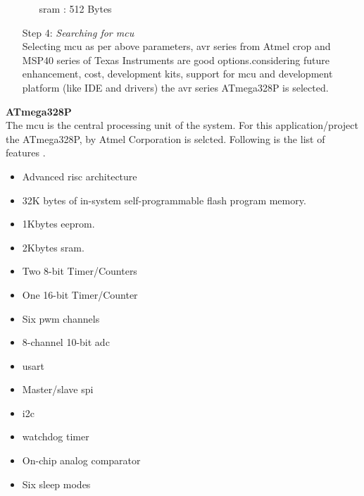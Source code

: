 \begin{itemize}
\begin{itemize}
				\item[\acrshort{sram} :] 512 Bytes
			\end{itemize}
		
		
		\item[Step 4:] \emph{Searching for \gls{mcu}}\\
		Selecting \gls{mcu} as per above parameters, \gls{avr} series from Atmel crop and MSP40 series of Texas Instruments are good options.considering future enhancement, cost, development kits, support for \gls{mcu} and development platform (like IDE and drivers) the \gls{avr} series ATmega328P is selected. 		 
		 
	\end{itemize}
	
	\textbf{ATmega328P}\\
	 
	   The \gls{mcu} is the central processing unit of the system. For this application/project the ATmega328P, by Atmel Corporation is selcted. Following is the list of features \cite{AtMega328P}.
	 
	 \begin{itemize}
		\item Advanced \gls{risc} architecture
		\item 32K bytes of in-system self-programmable flash program memory.
		\item 1Kbytes \gls{eeprom}.
		\item 2Kbytes \gls{sram}.
		\item Two 8-bit Timer/Counters
		\item One 16-bit Timer/Counter
		\item Six \gls{pwm} channels
		\item 8-channel 10-bit \gls{adc}
		\item \gls{usart}
		\item Master/slave \gls{spi}
		\item \gls{i2c}
		\item watchdog timer
		\item On-chip analog comparator
		\item Six sleep modes 
			
			
		
		
	\end{itemize}	  
	 
